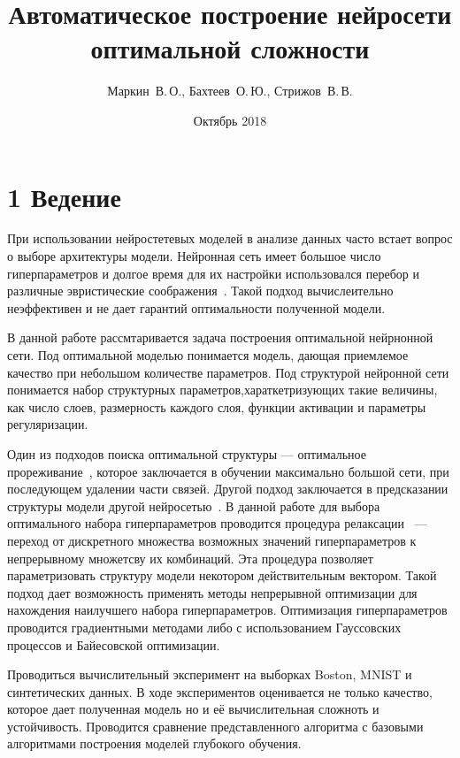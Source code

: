 \documentclass[12pt,twoside]{article}
\title{Автоматическое построение нейросети оптимальной сложности}
\author{Маркин~В.\,О., Бахтеев~О.\,Ю., Стрижов~В.\,В.}
\date{Октябрь 2018}
\begin{document}
\maketitle
\section{1 Ведение}
При использовании нейростетевых моделей в анализе данных часто встает вопрос о выборе архитектуры модели. Нейронная сеть имеет большое число гиперпараметров и долгое время для их настройки использовался перебор и различные эвристические соображения~\cite{DBLP:conf/emnlp/Kim14}. Такой подход вычислеительно неэффективен и не дает гарантий оптимальности полученной модели.


В данной работе рассмтаривается задача построения оптимальной нейрнонной сети.
Под оптимальной моделью понимается модель, дающая приемлемое качество при небольшом количестве параметров. Под структурой нейронной сети понимается набор структурных параметров,хараткетризующих такие величины, как число слоев, размерность каждого слоя, функции активации и параметры регуляризации.
 
 Один из подходов поиска оптимальной структуры --- оптимальное прореживание~\cite{Cun:1990:OBD:109230.109298}, которое заключается в обучении максимально большой сети, при последующем удалении части связей. Другой подход заключается в предсказании структуры модели другой нейросетью~\cite{Sutskever:2014:SSL:2969033.2969173}.
 В данной работе для выбора оптимального набора гиперпараметров проводится процедура релаксации~\cite{Liu2018DARTSDA} --- переход от дискретного множества возможных значений гиперпараметров к непрерывному множетсву их комбинаций. Эта процедура позволяет параметризовать структуру модели некотором действительным вектором.
Такой подход дает возможность применять методы непрерывной оптимизации для нахождения наилучшего набора гиперпараметров.
 Оптимизация гиперпараметров проводится градиентными методами \cite{pmlr-v37-maclaurin15, pmlr-v70-franceschi17a, Pedregosa} либо с использованием Гауссовских процессов и Байесовской оптимизации.



Проводиться вычислительный эксперимент на выборках Boston, MNIST\cite{lecun-mnisthandwrittendigit-2010} и синтетических данных. В ходе экспериментов оценивается не только качество, которое дает полученная модель но и её вычислительная сложноть и устойчивость. Проводится сравнение представленного алгоритма с базовыми алгоритмами построения моделей глубокого обучения.
\end{document}
